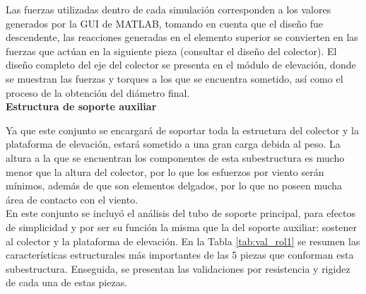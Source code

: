 Las fuerzas utilizadas dentro de cada simulación corresponden a los valores generados por la GUI de MATLAB, tomando en cuenta que el diseño fue descendente, las reacciones generadas en el elemento superior se convierten en las fuerzas que actúan en la siguiente pieza (consultar el diseño del colector). El diseño completo del eje del colector se presenta en el módulo de elevación, donde se muestran las fuerzas y torques a los que se encuentra sometido, así como el proceso de la obtención del diámetro final.\\

\textbf{Estructura de soporte auxiliar}

Ya que este conjunto se encargará de soportar toda la estructura del colector y la plataforma de elevación, estará sometido a una gran carga debida al peso. La altura a la que se encuentran los componentes de esta subestructura es mucho menor que la altura del colector, por lo que los esfuerzos por viento serán mínimos, además de que son elementos delgados, por lo que no poseen mucha área de contacto con el viento.\\

En este conjunto se incluyó el análisis del tubo de soporte principal, para efectos de simplicidad y por ser su función la misma que la del soporte auxiliar: sostener al colector y la plataforma de elevación. En la Tabla \ref{tab:val_rol1} se resumen las características estructurales más importantes de las 5 piezas que conforman esta subestructura. Enseguida, se presentan las validaciones por resistencia y rigidez de cada una de estas piezas.

